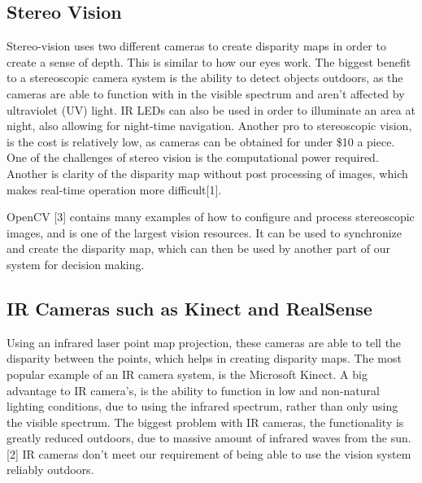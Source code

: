 \documentclass[compsoc,draftclsnofoot,onecolumn,10pt]{IEEEtran}
\begin{document}
\subsection{Stereo Vision}
Stereo-vision uses two different cameras to create disparity maps in order to create a sense of depth. 
This is similar to how our eyes work. 
The biggest benefit to a stereoscopic camera system is the ability to detect objects outdoors, as the cameras are able to function with in the visible spectrum and aren't affected by ultraviolet (UV) light. 
IR LEDs can also be used in order to illuminate an area at night, also allowing for night-time navigation. 
Another pro to stereoscopic vision, is the cost is relatively low, as cameras can be obtained for under \$10 a piece.  
One of the challenges of stereo vision is the computational power required. 
Another is clarity of the disparity map without post processing of images, which makes real-time operation more difficult[1]. 

OpenCV [3] contains many examples of how to configure and process stereoscopic images, and is one of the largest vision resources. It can be used to synchronize and create the disparity map, which can then be used by another part of our system for decision making. 

\subsection{IR Cameras such as Kinect and RealSense}
Using an infrared laser point map projection, these cameras are able to tell the disparity between the points, which helps in creating disparity maps. The most popular example of an IR camera system, is the Microsoft Kinect. 
A big advantage to IR camera's, is the ability to function in low and non-natural lighting conditions, due to using the infrared spectrum, rather than only using the visible spectrum. 
The biggest problem with IR cameras, the functionality is greatly reduced outdoors, due to massive amount of infrared waves from the sun. [2]
IR cameras don't meet our requirement of being able to use the vision system reliably outdoors.
\end{document}
